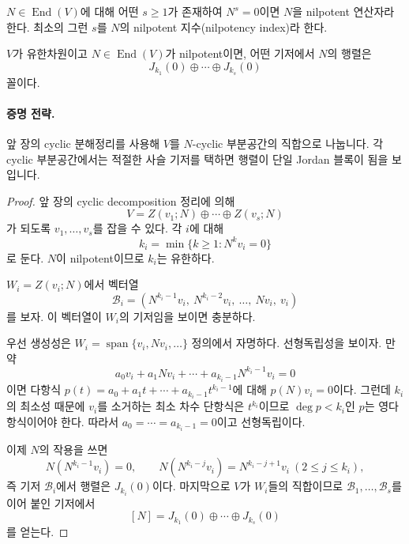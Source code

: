
\begin{definition}
$N\in\operatorname{End}(V)$에 대해 어떤 $s\ge1$가 존재하여 $N^s=0$이면 $N$을 nilpotent 연산자라 한다. 최소의 그런 $s$를 $N$의 nilpotent 지수(nilpotency index)라 한다.
\end{definition}

\begin{theorem}
$V$가 유한차원이고 $N\in\operatorname{End}(V)$가 nilpotent이면, 어떤 기저에서 $N$의 행렬은
$$
J_{k_1}(0)\oplus\cdots\oplus J_{k_s}(0)
$$
꼴이다.
\end{theorem}

\paragraph{증명 전략.}
앞 장의 cyclic 분해정리를 사용해 $V$를 $N$-cyclic 부분공간의 직합으로 나눕니다. 각 cyclic 부분공간에서는 적절한 사슬 기저를 택하면 행렬이 단일 Jordan 블록이 됨을 보입니다.

\begin{proof}
앞 장의 cyclic decomposition 정리에 의해
$$
V=Z(v_1;N)\oplus\cdots\oplus Z(v_s;N)
$$
가 되도록 $v_1,\dots,v_s$를 잡을 수 있다. 각 $i$에 대해
$$
k_i=\min\{k\ge1: N^k v_i=0\}
$$
로 둔다. $N$이 nilpotent이므로 $k_i$는 유한하다.

$W_i=Z(v_i;N)$에서 벡터열
$$
\mathcal{B}_i=(N^{k_i-1}v_i,\ N^{k_i-2}v_i,\ \dots,\ Nv_i,\ v_i)
$$
를 보자. 이 벡터열이 $W_i$의 기저임을 보이면 충분하다.

우선 생성성은 $W_i=\operatorname{span}\{v_i,Nv_i,\dots\}$ 정의에서 자명하다. 선형독립성을 보이자. 만약
$$
a_0 v_i+a_1 Nv_i+\cdots+a_{k_i-1}N^{k_i-1}v_i=0
$$
이면 다항식 $p(t)=a_0+a_1 t+\cdots+a_{k_i-1}t^{k_i-1}$에 대해 $p(N)v_i=0$이다. 그런데 $k_i$의 최소성 때문에 $v_i$를 소거하는 최소 차수 단항식은 $t^{k_i}$이므로 $\deg p<k_i$인 $p$는 영다항식이어야 한다. 따라서 $a_0=\cdots=a_{k_i-1}=0$이고 선형독립이다.

이제 $N$의 작용을 쓰면
$$
N(N^{k_i-1}v_i)=0,\qquad N(N^{k_i-j}v_i)=N^{k_i-j+1}v_i\ (2\le j\le k_i),
$$
즉 기저 $\mathcal{B}_i$에서 행렬은 $J_{k_i}(0)$이다. 마지막으로 $V$가 $W_i$들의 직합이므로 $\mathcal{B}_1,\dots,\mathcal{B}_s$를 이어 붙인 기저에서
$$
[N]=J_{k_1}(0)\oplus\cdots\oplus J_{k_s}(0)
$$
를 얻는다.
\end{proof}

